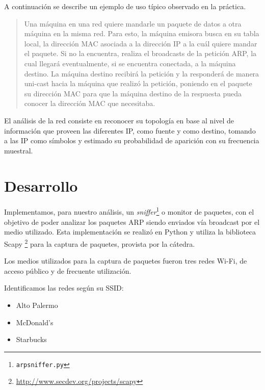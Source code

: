 \documentclass[a4paper, 10pt, twoside]{article}
\begin{document}
A continuación se describe un ejemplo de uso típico observado en la práctica.

\begin{quotation}
	Una máquina en una red quiere mandarle un paquete de datos a otra máquina en la misma red. Para esto, la máquina emisora busca en su tabla local, la dirección MAC asociada a la dirección IP a la cuál quiere mandar el paquete. Si no la encuentra, realiza el broadcasts de la petición ARP, la cual llegará eventualmente, si se encuentra conectada, a la máquina destino. La máquina destino recibirá la petición y la responderá de manera uni-cast hacia la máquina que realizó la petición, poniendo en el paquete su dirección MAC para que la máquina destino de la respuesta pueda conocer la dirección MAC que necesitaba.
\end{quotation}

El análisis de la red consiste en reconocer su topología en base al nivel de información que proveen las diferentes IP, como fuente y como destino, tomando a las IP como símbolos y estimado su probabilidad de aparición con su frecuencia muestral.




\section{Desarrollo}

Implementamos, para nuestro análisis, un \textit{sniffer}\footnote{\texttt{arpsniffer.py}} o monitor de paquetes, con el objetivo de poder analizar los paquetes ARP siendo enviados vía broadcast por el medio utilizado. Esta implementación se realizó en Python y utiliza la biblioteca Scapy \footnote{\url{http://www.secdev.org/projects/scapy}} para la captura de paquetes, provista por la cátedra.

Los medios utilizados para la captura de paquetes fueron tres redes Wi-Fi, de acceso público y de frecuente utilización.

Identificamos las redes según su SSID:

\begin{itemize}
	\item Alto Palermo
	\item McDonald's
	\item Starbucks
\end{itemize}
\end{document}
